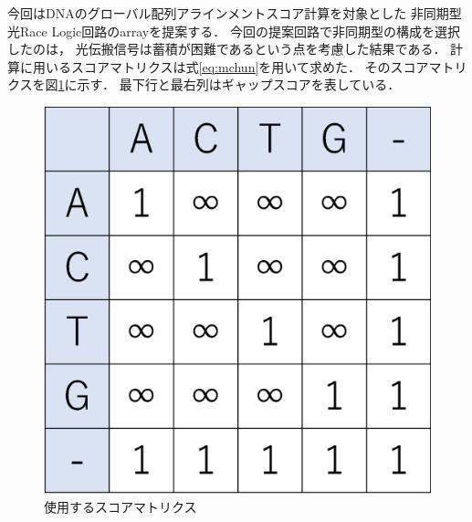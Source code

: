 今回はDNAのグローバル配列アラインメントスコア計算を対象とした
非同期型光Race Logic回路のarrayを提案する．
今回の提案回路で非同期型の構成を選択したのは，
光伝搬信号は蓄積が困難であるという点を考慮した結果である．
計算に用いるスコアマトリクスは式\ref{eq:mchun}を用いて求めた．
そのスコアマトリクスを図\ref{fig:scorematrix_3}に示す．
最下行と最右列はギャップスコアを表している．
\begin{figure}[t!]
\begin{center}
\includegraphics[keepaspectratio,scale=0.3]{fig/3/scorematrix.eps}
\caption{使用するスコアマトリクス}
\label{fig:scorematrix_3}
\end{center}
\end{figure}

